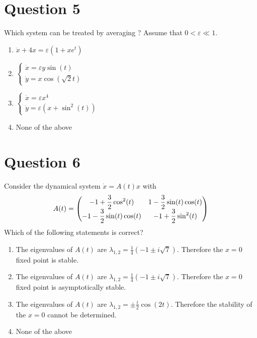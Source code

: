 \documentclass[twoside,10pt,a4paper]{article}
\begin{document}
\section*{Question 5}
Which system can be treated by averaging ? Assume that $0 < \varepsilon \ll 1$.

\begin{enumerate}[label=(\alph*)]
	\item $ \ddot{x} + 4x = \varepsilon(1 + x e^t) $
	\item $ \displaystyle \begin{cases}
		\dot{x} = \varepsilon y \sin(t) \\
		\dot{y} = x \cos(\sqrt{2}t)
	\end{cases} $
	\item $ \displaystyle \begin{cases}
		\dot{x} = \varepsilon x^4 \\
		\dot{y} = \varepsilon(x + \sin^2(t))
	\end{cases} $
	\item None of the above
\end{enumerate}

\section*{Question 6}
Consider the dynamical system $ \dot{x} = A(t)x $ with
\begin{equation*}
	A(t) = {\renewcommand*{\arraystretch}{1.25}\begin{pmatrix}
		\displaystyle -1 + \frac{3}{2}\cos^2(t) & \displaystyle 1 - \frac{3}{2} \sin(t)\cos(t) \\
		\displaystyle -1 - \frac{3}{2} \sin(t)\cos(t) & \displaystyle -1 + \frac{3}{2} \sin^2(t)
	\end{pmatrix}}
\end{equation*}
Which of the following statements is correct?

\begin{enumerate}[label=(\alph*)]
	\item The eigenvalues of $A(t)$ are $\displaystyle \lambda_{1,2} = \frac{1}{4}(-1 \pm i\sqrt{7})$. Therefore the $x = 0$ fixed point is stable.
	\item The eigenvalues of $A(t)$ are $\displaystyle \lambda_{1,2} = \frac{1}{4}(-1 \pm i\sqrt{7})$. Therefore the $x = 0$ fixed point is asymptotically stable.
	\item The eigenvalues of $A(t)$ are $\displaystyle \lambda_{1,2} = \pm \frac{i}{2}\cos(2t)$. Therefore the stability of the $x = 0$ cannot be determined.
	\item None of the above
\end{enumerate}
\end{document}

